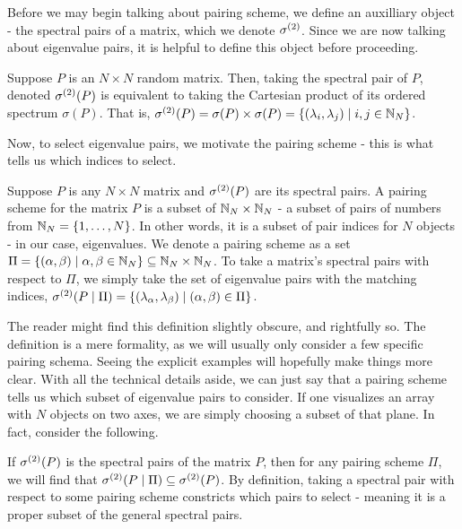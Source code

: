 Before we may begin talking about pairing scheme, we define an auxilliary object - the spectral pairs of a matrix, which we denote ${\sigma^{(2)}}$. Since we are now talking about eigenvalue pairs, it is helpful to define this object before proceeding.

\begin{definition}
Suppose $P$ is an $N \times N$ random matrix. Then, taking the spectral pair of $P$, denoted ${\sigma^{(2)}}(P)$ is equivalent to taking the Cartesian product of its ordered spectrum $\sigma(P)$. That is, ${\sigma^{(2)}}(P) = \sigma(P) \times \sigma(P) = \{(\lambda_i, \lambda_j) \mid i,j \in \mathbb{N}_N\}$.
\end{definition}

Now, to select eigenvalue pairs, we motivate the pairing scheme - this is what tells us which indices to select.

\begin{definition}
Suppose $P$ is any $N \times N$ matrix and ${\sigma^{(2)}}(P)$ are its spectral pairs. A pairing scheme for the matrix $P$ is a subset of $\mathbb{N}_N \times \mathbb{N}_N$ - a subset of pairs of numbers from $\mathbb{N}_N = \{1, \dots, N\}$. In other words, it is a subset of pair indices for $N$ objects - in our case, eigenvalues. We denote a pairing scheme as a set $\Pi = \{(\alpha, \beta) \mid \alpha, \beta \in \mathbb{N}_N\} \subseteq \mathbb{N}_N \times \mathbb{N}_N$. To take a matrix's spectral pairs with respect to $\Pi$, we simply take the set of eigenvalue pairs with the matching indices, ${\sigma^{(2)}}(P \mid \Pi) = \{(\lambda_{\alpha},\lambda_{\beta}) \mid ({\alpha},{\beta}) \in \Pi\}$.
\end{definition}

The reader might find this definition slightly obscure, and rightfully so. The definition is a mere formality, as we will usually only consider a few specific pairing schema. Seeing the explicit examples will hopefully make things more clear. With all the technical details aside, we can just say that a pairing scheme tells us which subset of eigenvalue pairs to consider. If one visualizes an array with $N$ objects on two axes, we are simply choosing a subset of that plane. In fact, consider the following.

\begin{remark} If ${\sigma^{(2)}}(P)$ is the spectral pairs of the matrix $P$, then for any pairing scheme $\Pi$, we will find that ${\sigma^{(2)}}(P \mid \Pi) \subseteq {\sigma^{(2)}}(P)$. By definition, taking a spectral pair with respect to some pairing scheme constricts which pairs to select - meaning it is a proper subset of the general spectral pairs.
\end{remark}


